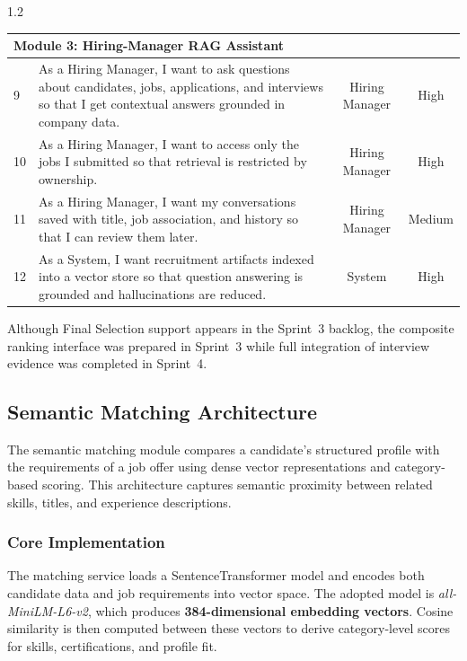 \begin{spacing}{1.2}
\begin{center}
\begin{tabularx}{\textwidth}{|l|X|c|c|}
\multicolumn{4}{|l|}{\cellcolor{gray!10}\textbf{Module 3: Hiring-Manager RAG Assistant}} \\ \hline
9 & As a Hiring Manager, I want to ask questions about candidates, jobs, applications, and interviews so that I get contextual answers grounded in company data. & Hiring Manager & High \\ \hline
10 & As a Hiring Manager, I want to access only the jobs I submitted so that retrieval is restricted by ownership. & Hiring Manager & High \\ \hline
11 & As a Hiring Manager, I want my conversations saved with title, job association, and history so that I can review them later. & Hiring Manager & Medium \\ \hline
12 & As a System, I want recruitment artifacts indexed into a vector store so that question answering is grounded and hallucinations are reduced. & System & High \\ \hline

\end{tabularx}
\end{center}
\end{spacing}

Although Final Selection support appears in the Sprint~3 backlog, the composite ranking interface was prepared in Sprint~3 while full integration of interview evidence was completed in Sprint~4.

\subsection{Semantic Matching Architecture}
\label{sec:sprint3:semantic_matching_architecture}

The semantic matching module compares a candidate's structured profile with the requirements of a job offer using dense vector representations and category-based scoring. This architecture captures semantic proximity between related skills, titles, and experience descriptions.



\subsubsection{Core Implementation}

The matching service loads a SentenceTransformer model and encodes both candidate data and job requirements into vector space. The adopted model is \textit{all-MiniLM-L6-v2}, which produces \textbf{384-dimensional embedding vectors}. Cosine similarity is then computed between these vectors to derive category-level scores for skills, certifications, and profile fit.

